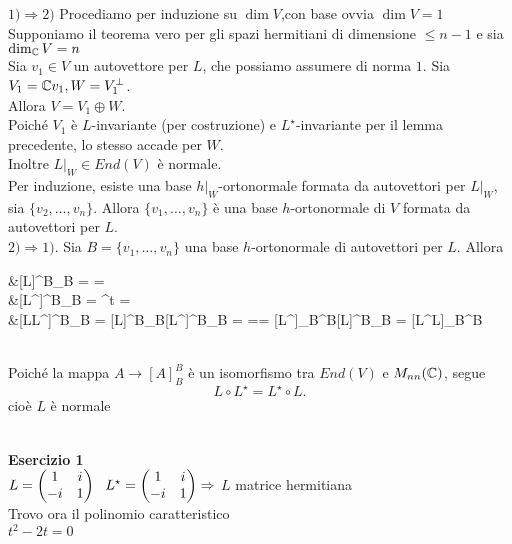 \documentclass[12px]{article}
\begin{document}
	\begin{dimo}
		$1) \Rightarrow  2)$ Procediamo per induzione su $\dim V$,con base ovvia $\dim V = 1$ \\
		Supponiamo il teorema vero per gli spazi hermitiani di dimensione $\leq n-1$ e sia  $\dim_{\mathbb{C}} V = n$\\
		Sia  $v_1\in V$ un autovettore per $L$, che possiamo assumere di norma  $1$. Sia $V_1 = \mathbb{C} v_1, W = V_1^\perp$.\\
		Allora $V = V_1 \oplus W$.\\
		Poiché $V_1$ è $L$-invariante (per costruzione) e $L^\star$-invariante per il lemma precedente, lo stesso accade per  $W$.\\
		Inoltre $L|_W\in End(V)$ è normale.\\
		Per induzione, esiste una base $h|_W$-ortonormale formata da autovettori per $L|_W$, sia $\{v_2,\ldots,v_n\}.$ Allora $\{v_1,\ldots,v_n\}$ è una base $h$-ortonormale di $V$ formata da autovettori per $L$.\\
		$2) \Rightarrow 1)$. Sia $B = \{v_1,\ldots,v_n\}$ una base $h$-ortonormale di autovettori per $L$. Allora\\
		\begin{aligned}
			\hspace{80px}&[L]^B_B = \bigwedge = \\
			    &[L^\star]^B_B = ^t = \overline{\bigwedge}\\
			    &[L\circ L^\star]^B_B = [L]^B_B[L^\star]^B_B = \bigwedge\overline{\bigwedge}=\overline{\bigwedge}\bigwedge = [L^\star]_B^B[L]^B_B = [L^\star \circ L]_B^B
		 \end{aligned} \\
		 Poiché la mappa $A \rightarrow [A]^B_B$ è un isomorfismo tra
		 $End(V)$ e $M_{nn}(\mathbb{C})$, segue 
		 \[
		 L\circ L^\star = L^\star \circ L
		 .\] 
		 cioè $L$ è normale
	\end{dimo}
	 \hline \ \\[10px]
	 \textbf{Esercizio 1}\\[10px]
	$ L = \begin{pmatrix}1&i\\-i&1\end{pmatrix}\ \ L^\star = \begin{pmatrix}1&i\\-i&1\end{pmatrix} \Rightarrow $ $L$ matrice hermitiana\\
	Trovo ora il polinomio caratteristico\\
$t^2 - 2t = 0$ 
\end{document}
